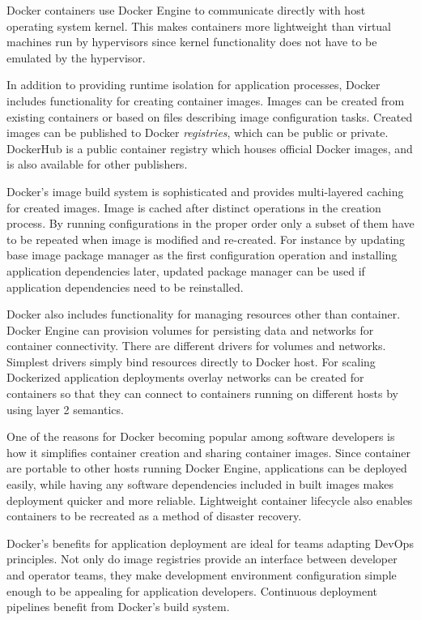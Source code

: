 \documentclass[officiallayout]{tktla}
\begin{document}
Docker containers use Docker Engine to communicate directly with host operating
system kernel. This makes containers more lightweight than virtual machines run
by hypervisors since kernel functionality does not have to be emulated by the
hypervisor.

In addition to providing runtime isolation for application processes, Docker
includes functionality for creating container images. Images can be created
from existing containers or based on files describing image configuration
tasks. Created images can be published to Docker \textit{registries}, which can
be public or private. DockerHub is a public container registry which houses
official Docker images, and is also available for other publishers.

Docker's image build system is sophisticated and provides multi-layered caching
for created images. Image is cached after distinct operations in the creation
process. By running configurations in the proper order only a subset of them
have to be repeated when image is modified and re-created. For instance by
updating base image package manager as the first configuration operation and
installing application dependencies later, updated package manager can be used
if application dependencies need to be reinstalled.

Docker also includes functionality for managing resources other than container.
Docker Engine can provision volumes for persisting data and networks for
container connectivity. There are different drivers for volumes and networks.
Simplest drivers simply bind resources directly to Docker host. For scaling
Dockerized application deployments overlay networks can be created for
containers so that they can connect to containers running on different hosts by
using layer 2 semantics.

One of the reasons for Docker becoming popular among software developers is how
it simplifies container creation and sharing container images. Since container
are portable to other hosts running Docker Engine, applications can be deployed
easily, while having any software dependencies included in built images makes
deployment quicker and more reliable. Lightweight container lifecycle also
enables containers to be recreated as a method of disaster recovery.

Docker's benefits for application deployment are ideal for teams adapting
DevOps principles. Not only do image registries provide an interface between
developer and operator teams, they make development environment configuration
simple enough to be appealing for application developers. Continuous deployment
pipelines benefit from Docker's build system.
\end{document}
